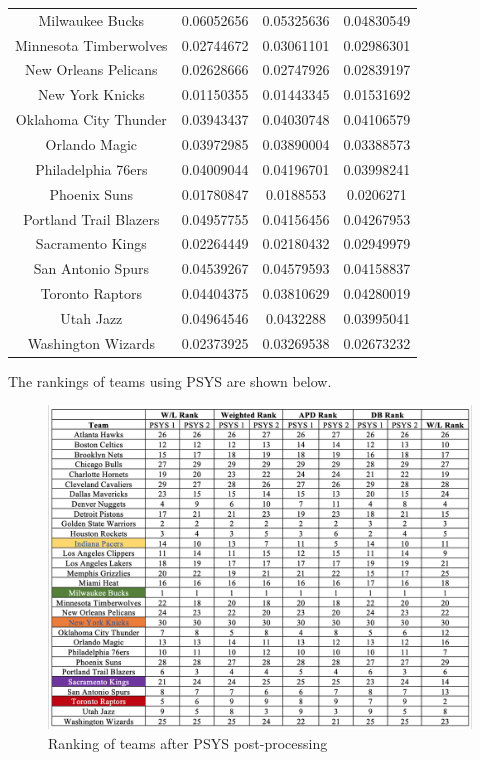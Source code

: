 \documentclass[12pt]{article}%
\begin{document}
\begin{center}
\begin{tabular}{|c|c|c|c|}
Milwaukee Bucks &0.06052656 &0.05325636 &0.04830549\\
Minnesota Timberwolves&0.02744672 &0.03061101 &0.02986301\\
New Orleans Pelicans&0.02628666 &0.02747926 &0.02839197\\
New York Knicks&0.01150355 &0.01443345 &0.01531692\\
Oklahoma City Thunder&0.03943437 &0.04030748 &0.04106579\\
Orlando Magic&0.03972985 &0.03890004 &0.03388573\\
Philadelphia 76ers&0.04009044 &0.04196701 &0.03998241\\
Phoenix Suns&0.01780847 &0.0188553  &0.0206271 \\
Portland Trail Blazers&0.04957755 &0.04156456 &0.04267953\\
Sacramento Kings&0.02264449 &0.02180432 &0.02949979\\
San Antonio Spurs &0.04539267 &0.04579593 &0.04158837\\
Toronto Raptors&0.04404375 &0.03810629 &0.04280019\\
Utah Jazz&0.04964546 &0.0432288  &0.03995041\\
Washington Wizards&0.02373925 &0.03269538 &0.02673232\\
\hline
\end{tabular}
\end{center}
\newpage The rankings of teams using PSYS are shown below.
\begin{figure}[H]
  \centering
  \includegraphics[width=6in]{./images/psys_appendix.png}
  \caption[Ranking of teams after PSYS post-processing]{Ranking of teams after PSYS post-processing}
\end{figure}
\end{document}
